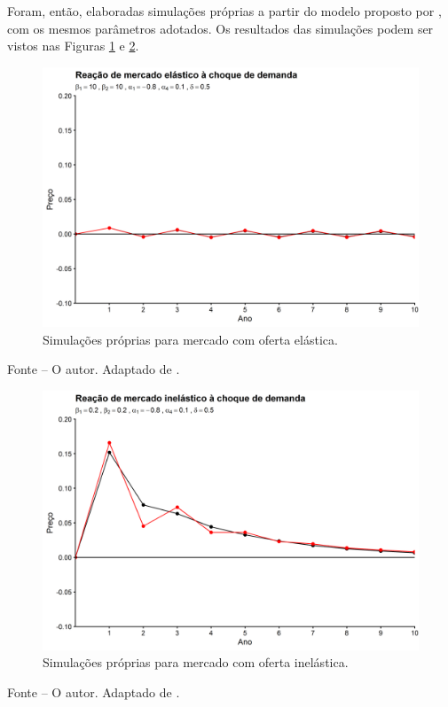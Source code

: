 \documentclass[
	12pt,				%
	oneside,			%
	a4paper,			%
	chapter=TITLE,		%
	section=TITLE,		%
	english,			%
	brazil				%
	]{abntex2}
\newcommand{\bcenter}{\begin{center}}
\newcommand{\ecenter}{\end{center}}
\begin{document}
\begin{refsection}
Foram, então, elaboradas simulações próprias a partir do modelo proposto por
\textcite{Malpezzi2002TheRO}, com os mesmos parâmetros adotados. Os resultados das
simulações podem ser vistos nas Figuras \ref{fig:elastico} e
\ref{fig:inelastico}.
\begin{figure}[H]

{\centering \includegraphics[width=0.7\linewidth]{images/elastico-1} 

}

\caption{Simulações próprias para mercado com oferta elástica.}\label{fig:elastico}
\end{figure}
\bcenter

\small Fonte -- O autor. Adaptado de \textcite{Malpezzi2002TheRO}.
\ecenter
\begin{figure}[H]

{\centering \includegraphics[width=0.7\linewidth]{images/inelastico-1} 

}

\caption{Simulações próprias para mercado com oferta inelástica.}\label{fig:inelastico}
\end{figure}
\bcenter

\small Fonte -- O autor. Adaptado de \textcite{Malpezzi2002TheRO}.
\ecenter

\hypertarget{medidas-macroprudenciais-de-prevenuxe7uxe3o-de-bolhas}{%
}
\end{refsection}
\end{document}
